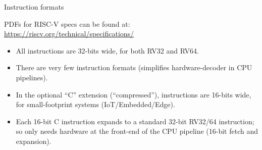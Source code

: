 \documentclass{article}
\begin{document}
\begin{center}
{\Huge
  Instruction formats}

\vspace{1ex}

PDFs for RISC-V specs can be found at: \url{https://riscv.org/technical/specifications/}

\begin{itemize}\LARGE
\item All instructions are 32-bits wide, for both RV32 and RV64.

\item  There are very few instruction formats (simplifies hardware-decoder in CPU pipelines).
\end{itemize}

\vspace{0.5in}


\vspace{0.5in}

\begin{itemize}\LARGE
\item In the optional ``C'' extension (``compressed''), instructions
  are 16-bits wide, for small-footprint systems (IoT/Embedded/Edge).

\item Each 16-bit C instruction expands to a standard 32-bit RV32/64
  instruction; so only needs hardware at the front-end of the CPU
  pipeline (16-bit fetch and expansion).
\end{itemize}

\end{center}

\clearpage
\end{document}
